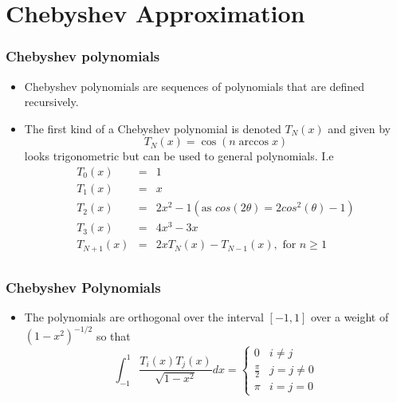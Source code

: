 \documentclass[10pt]{beamer}
\begin{document}
\section{Chebyshev Approximation}

\begin{frame}
  \frametitle{Chebyshev polynomials}
  \begin{itemize}
  \item Chebyshev polynomials are sequences of polynomials that are defined recursively.
  \item The first kind of a Chebyshev polynomial is denoted $T_N(x)$ and given by
    \[
      T_N(x) = \cos( n \arccos x)
    \]
    looks trigonometric but can be used to general polynomials. I.e
    \[
      \begin{array}{rcl}
        T_0(x)     & = & 1\\
        T_1(x)     & = & x\\
        T_2(x)     & = & 2 x^2 - 1 (\mbox{as } cos(2\theta) = 2cos^2(\theta) -1) \\
        T_3(x)     & = & 4 x^3 - 3 x \\
        T_{N+1}(x)  & = & 2 x T_N(x) - T_{N-1}(x), \mbox{ for } n \geq 1\\
      \end{array}
    \]
  \end{itemize}
\end{frame}

\begin{frame}
  \frametitle{Chebyshev Polynomials}
  \begin{itemize}
  \item The polynomials are orthogonal over the interval $[-1,1]$ over a weight of $(1-x^2)^{-1/2}$ so that
    \[
      \int_{-1}^1 \frac{T_i(x) T_j(x)}{\sqrt{1-x^2}} dx = \left\{
        \begin{array}{ll}
          0& i \neq j\\
          \frac{\pi}{2} & j = j \neq 0\\
          \pi & i = j = 0
        \end{array}\right.
    \]
  \end{itemize}
\end{frame}
\end{document}
